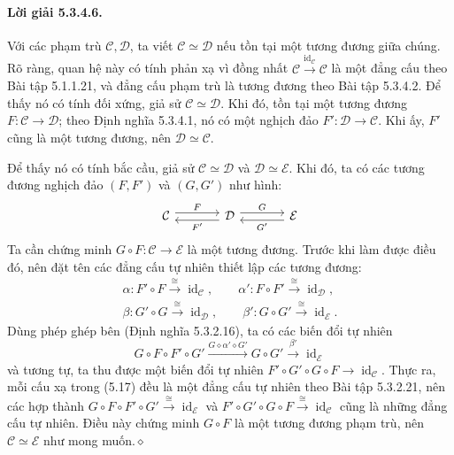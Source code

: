 \paragraph{Lời giải 5.3.4.6.} Với các phạm trù $\mathcal C,\mathcal D$, ta viết $\mathcal C\simeq\mathcal D$ nếu tồn tại một tương đương giữa chúng. Rõ ràng, quan hệ này có tính phản xạ vì đồng nhất $\mathcal C\xrightarrow{\operatorname{id}_{\mathcal C}}\mathcal C$ là một đẳng cấu theo Bài tập 5.1.1.21, và đẳng cấu phạm trù là tương đương theo Bài tập 5.3.4.2.
Để thấy nó có tính đối xứng, giả sử $\mathcal C\simeq\mathcal D$. Khi đó, tồn tại một tương đương $F:\mathcal C\to\mathcal D$; theo Định nghĩa 5.3.4.1, nó có một nghịch đảo $F':\mathcal D\to\mathcal C$. Khi ấy, $F'$ cũng là một tương đương, nên $\mathcal D\simeq\mathcal C$.

Để thấy nó có tính bắc cầu, giả sử $\mathcal C\simeq\mathcal D$ và $\mathcal D\simeq\mathcal E$. Khi đó, ta có các tương đương nghịch đảo $(F,F')$ và $(G,G')$ như hình:
\[\begin{tikzcd}[column sep=large]\mathcal C\arrow[r,shift left=3pt,"F"]&\mathcal D\arrow[l,shift left=3pt,"F'"]\arrow[r,shift left=3pt,"G"]&\mathcal E\arrow[l,shift left=3pt,"G'"]\end{tikzcd}\]
Ta cần chứng minh $G\circ F:\mathcal C\to\mathcal E$ là một tương đương. Trước khi làm được điều đó, nên đặt tên các đẳng cấu tự nhiên thiết lập các tương đương:
\[\begin{gathered}
\alpha:F'\circ F\xrightarrow{\cong}\operatorname{id}_{\mathcal C},\qquad\alpha':F\circ F'\xrightarrow{\cong}\operatorname{id}_{\mathcal D},\\
\beta:G'\circ G\xrightarrow{\cong}\operatorname{id}_{\mathcal D},\qquad\beta':G\circ G'\xrightarrow{\cong}\operatorname{id}_{\mathcal E}.
\end{gathered}\]
Dùng phép ghép bên (Định nghĩa 5.3.2.16), ta có các biến đổi tự nhiên
\begin{equation*}G\circ F\circ F'\circ G'\xrightarrow{G\diamond\alpha'\diamond G'}G\circ G'\xrightarrow{\beta'}\operatorname{id}_{\mathcal E}\tag{5.17}\end{equation*}
và tương tự, ta thu được một biến đổi tự nhiên $F'\circ G'\circ G\circ F\to\operatorname{id}_{\mathcal C}$. Thực ra, mỗi cấu xạ trong (5.17) đều là một đẳng cấu tự nhiên theo Bài tập 5.3.2.21, nên các hợp thành $G\circ F\circ F'\circ G'\xrightarrow{\cong}\operatorname{id}_{\mathcal E}$ và $F'\circ G'\circ G\circ F\xrightarrow{\cong}\operatorname{id}_{\mathcal C}$ cũng là những đẳng cấu tự nhiên. Điều này chứng minh $G\circ F$ là một tương đương phạm trù, nên $\mathcal C\simeq\mathcal E$ như mong muốn.\hfill$\diamond$
